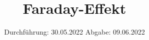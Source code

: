

\subject{V46}
\title{Faraday-Effekt}
\date{%
  Durchführung: 30.05.2022
  \hspace{3em}
  Abgabe: 09.06.2022
}



\maketitle
\thispagestyle{empty}
\tableofcontents
\newpage






\printbibliography{}


